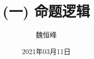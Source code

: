 \documentclass[]{beamer}
\title[(一) 命题逻辑 (Propositional Logic)]{(一) 命题逻辑}
\author[魏恒峰]{\large 魏恒峰}
\institute{hfwei@nju.edu.cn}
\date{2021年03月11日}
\begin{document}
\maketitle






\thankyou{}

\end{document}
